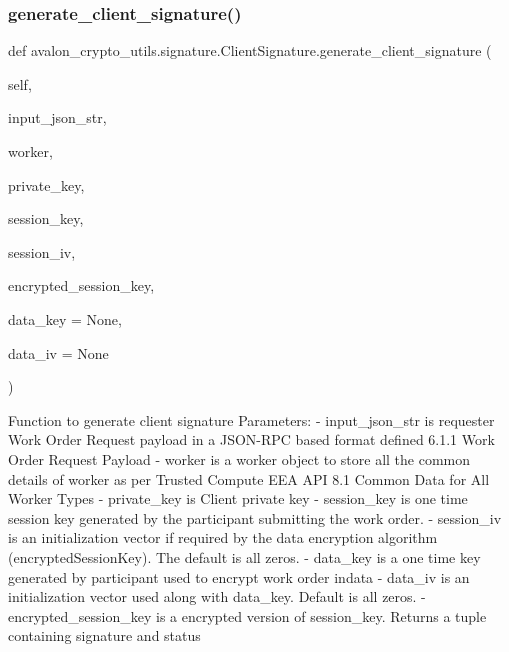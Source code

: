 \subsubsection{\texorpdfstring{generate\+\_\+client\+\_\+signature()}{generate\_client\_signature()}}
{\footnotesize\ttfamily def avalon\+\_\+crypto\+\_\+utils.\+signature.\+Client\+Signature.\+generate\+\_\+client\+\_\+signature (\begin{DoxyParamCaption}\item[{}]{self,  }\item[{}]{input\+\_\+json\+\_\+str,  }\item[{}]{worker,  }\item[{}]{private\+\_\+key,  }\item[{}]{session\+\_\+key,  }\item[{}]{session\+\_\+iv,  }\item[{}]{encrypted\+\_\+session\+\_\+key,  }\item[{}]{data\+\_\+key = {\ttfamily None},  }\item[{}]{data\+\_\+iv = {\ttfamily None} }\end{DoxyParamCaption})}

\begin{DoxyVerb}Function to generate client signature
Parameters:
    - input_json_str is requester Work Order Request payload in a
      JSON-RPC based format defined 6.1.1 Work Order Request Payload
    - worker is a worker object to store all the common details of
      worker as per Trusted Compute EEA API 8.1
      Common Data for All Worker Types
    - private_key is Client private key
    - session_key is one time session key generated by the participant
      submitting the work order.
    - session_iv is an initialization vector if required by the
      data encryption algorithm (encryptedSessionKey).
      The default is all zeros.
    - data_key is a one time key generated by participant used to
      encrypt work order indata
    - data_iv is an initialization vector used along with data_key.
      Default is all zeros.
    - encrypted_session_key is a encrypted version of session_key.
Returns a tuple containing signature and status
\end{DoxyVerb}
 \mbox{\label{classavalon__crypto__utils_1_1signature_1_1ClientSignature_a3ab018d83dee017cac1091782a96ccd0}} 
